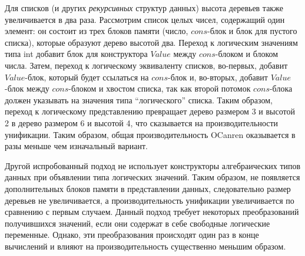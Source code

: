 \documentclass[10pt]{article}
\begin{document}
Для списков (и других \emph{рекурсивных} структур данных) высота деревьев также увеличивается в два раза. Рассмотрим
список целых чисел, содержащий один элемент: он состоит из трех блоков памяти (число, $cons$-блок и блок для пустого списка),
которые образуют дерево высотой два. Переход к логическим значениям типа int добавит блок для конструктора $Value$
между $cons$-блоком и блоком числа. Затем, переход к логическому эквиваленту списков, во-первых, добавит $Value$-блок, который будет
ссылаться на $cons$-блок и, во-вторых, добавит $Value$-блок между $cons$-блоком и хвостом списка, так как второй потомок
$cons$-блока должен указывать на значения типа ``логического'' списка. Таким образом, переход к логическому представлению
превращает дерево размером 3 и высотой 2 в дерево размером 6 и высотой 4, что сказывается на производительности унификации.
Таким образом, общая производительность OCanren оказывается в разы меньше чем изначальный вариант.

Другой испробованный подход не использует конструкторы алгебраических типов данных при объявлении типа логических значений.
Таким образом, не появляется дополнительных блоков памяти в представлении данных, следовательно размер деревьев не увеличивается,
а производительность унификации увеличивается по сравнению с первым случаем. Данный подход требует некоторых
преобразований получившихся значений, если они содержат в себе свободные логические переменные. Однако, эти преобразования
происходят один раз в конце вычислений и влияют на производительность существенно меньшим образом.



\end{document}
